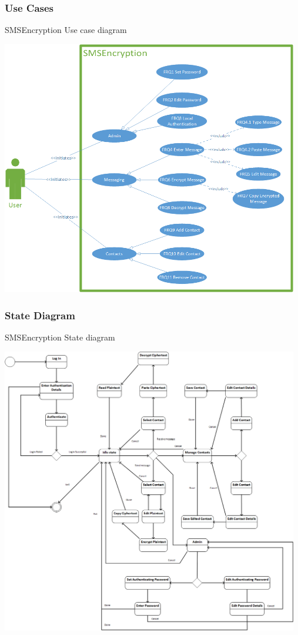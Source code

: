 \newpage
\subsubsection{Use Cases}
SMSEncryption Use case diagram

\begin{center}
 \includegraphics[width=13cm]{diagrams/UseCaseDiagrams/UsecaseV3.png}
\end{center}

\newpage
\subsubsection{State Diagram}
SMSEncryption State diagram

\begin{center}
 \includegraphics[width=13cm]{diagrams/StateDiagrams/SMSEncryptionStateMachine.png}
\end{center}


